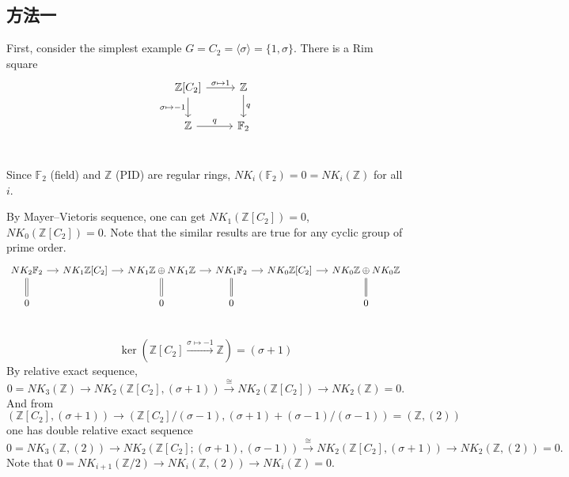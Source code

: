 {\normalsize \color{gray}\subsection{方法一}
\label{sec:C2Cp}
First, consider the simplest example $G=C_2=\langle \sigma \rangle=\{1, \sigma\}$. There is a Rim square
\begin{equation}
\label{rimsqC2}
	\begin{tikzcd}
		\mathbb{Z}[C_2] \ar[r, "\sigma\mapsto 1"] \ar[d, "\sigma\mapsto -1"']& \mathbb{Z}\ar[d, "q"]\\
		 \mathbb{Z}\ar[r, "q"] & \mathbb{F}_2\\
	\end{tikzcd}
\end{equation}
	
Since $\mathbb{F}_2$ (field) and $\mathbb{Z}$ (PID) are regular rings, $NK_i(\mathbb{F}_2)=0=NK_i(\mathbb{Z})$ for all $i$. 

By Mayer–Vietoris sequence, one can get $NK_1(\mathbb{Z}[C_2])=0$, $NK_0(\mathbb{Z}[C_2])=0$. Note that the similar results are true for any cyclic group of prime order. 
	\[\begin{tikzcd}[column sep=small]
		NK_2 \mathbb{F}_2 \ar[r] \ar[d, equal]& NK_1 \mathbb{Z}[C_2] \ar[r] & NK_1 \mathbb{Z} \oplus NK_1 \mathbb{Z} \ar[r] \ar[d, equal]& NK_1 \mathbb{F}_2 \ar[r] \ar[d, equal] & NK_0 \mathbb{Z}[C_2] \ar[r]&NK_0 \mathbb{Z} \oplus NK_0 \mathbb{Z}  \ar[d, equal] \\
		0 & & 0 &0 & & 0\\
	\end{tikzcd}\]

\[\ker(\mathbb{Z}[C_2]\overset{\sigma \mapsto -1}\longrightarrow \mathbb{Z}) =(\sigma +1)\]
By relative exact sequence, 
\[0=NK_3(\mathbb{Z})\longrightarrow NK_2(\mathbb{Z}[C_2], (\sigma+1))\overset{\cong}\longrightarrow NK_2(\mathbb{Z}[C_2])\longrightarrow NK_2(\mathbb{Z})=0. \]
And from $(\mathbb{Z}[C_2], (\sigma+1))\longrightarrow (\mathbb{Z}[C_2]/(\sigma-1), (\sigma+1)+(\sigma-1)/(\sigma-1))=(\mathbb{Z}, (2))$ one has double relative exact sequence
\[0=NK_3(\mathbb{Z}, (2))\longrightarrow NK_2(\mathbb{Z}[C_2];(\sigma+1), (\sigma-1))\overset{\cong}\longrightarrow NK_2(\mathbb{Z}[C_2], (\sigma+1))\longrightarrow NK_2(\mathbb{Z}, (2))=0. \]
Note that $0=NK_{i+1}(\mathbb{Z}/2)\longrightarrow NK_i(\mathbb{Z}, (2))\longrightarrow NK_i(\mathbb{Z})=0$. 

}
